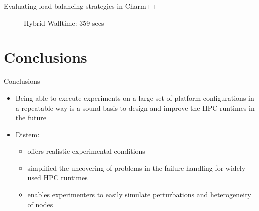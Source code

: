 \documentclass[11pt,xcolor=dvipsnames,presentation]{beamer}
\begin{document}
\begin{frame}[label=sec-3-0-6]{Evaluating load balancing strategies in Charm++}
\begin{minipage}{0.3\textwidth}
\begin{center}
\begin{figure}
    \caption{\centering Hybrid \newline Walltime: 359 secs}
        \label{fig:hybridlbh}
\end{figure}
    \end{center}\end{minipage}
\end{frame}


\section{Conclusions}
\label{sec-4}

\begin{frame}[label=sec-4-0-1]{Conclusions}
\begin{itemize}
\item Being able to execute experiments on a large set of platform
configurations in a repeatable way is a sound basis to design
and improve the HPC runtimes in the future
\end{itemize}

\vspace{0.5cm}
\begin{itemize}
\item \alert{Distem:}
\begin{itemize}
\item offers realistic experimental conditions

\item simplified the uncovering of problems in the
failure handling for widely used HPC runtimes

\item enables experimenters to easily simulate perturbations and
heterogeneity of nodes
\end{itemize}
\end{itemize}
\end{frame}
\end{document}
